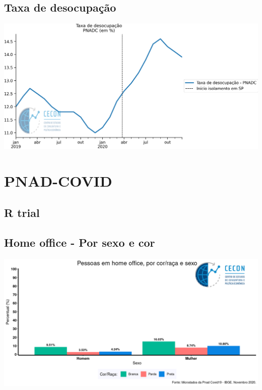 \documentclass{SelfArx}
\begin{document}
\subsection*{Taxa de desocupação}
\label{sec:org5d0fe1c}

\begin{center}
\includegraphics[width=.9\linewidth]{./figs/Emprego/TaxaDesocupacao.png}
\end{center}

\section*{PNAD-COVID}
\label{sec:orgfe6675c}
\subsection*{R trial}
\label{sec:org2497e9a}
\subsection*{Home office - Por sexo e cor}
\label{sec:org523c96c}




\begin{center}
\includegraphics[width=.9\linewidth]{./figs/PNAD_COVID/home_sexo_cor.png}
\end{center}
\end{document}
